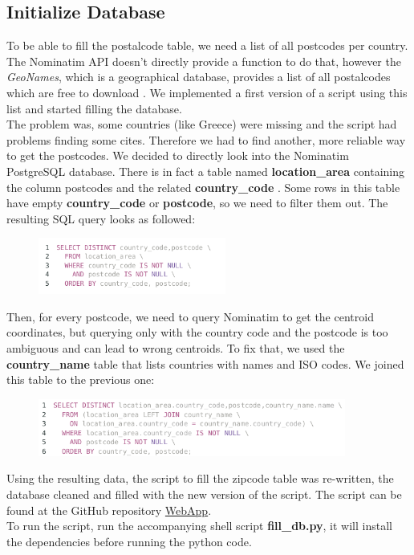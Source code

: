 \subsection{Initialize Database}
To be able to fill the postalcode table, we need a list of all postcodes per country. The Nominatim API doesn't directly provide a function to do that, however the \emph{GeoNames}, which is a geographical database, provides a list of all postalcodes which are free to download \citep{GeoNames}.
We implemented a first version of a script using this list and started filling the database.\\
The problem was, some countries (like Greece) were missing and the script had problems finding some cites.  Therefore we had to find another, more reliable way to get the postcodes.
We decided to directly look into the Nominatim PostgreSQL database. There is in fact a table named
\textbf{location\_area} containing the column postcodes and the related \textbf{country\_code} .
Some rows in this table have empty \textbf{country\_code} or \textbf{postcode}, so we need to filter them out. The resulting SQL query looks as followed:
\begin{figure}[H]
\hspace{1.2cm}
\includegraphics[width=0.55\textwidth]{img/query1}\label{pic:q1}
\end{figure}
\noindent Then, for every postcode, we need to query Nominatim to get the centroid coordinates, but querying only with the country code and the postcode is too ambiguous and can lead to wrong centroids. To fix that, we used the \textbf{country\_name} table that lists countries with names and ISO codes. We joined this table to the previous one:
\begin{figure}[H]
\hspace{1.2cm}
\includegraphics[width=0.9\textwidth]{img/query2}\label{pic:q2}
\end{figure}
\noindent Using the resulting data, the script to fill the zipcode table was re-written, the database cleaned and filled with the new version of the script. The script can be found at the GitHub repository \href{https://github.com/dataBikeHsUlm/WebApp/blob/master/fill_db_from_osm.py}{WebApp}. \\To run the script, run the accompanying shell script \textbf{fill\_db.py}, it will install the dependencies before running the python code.

